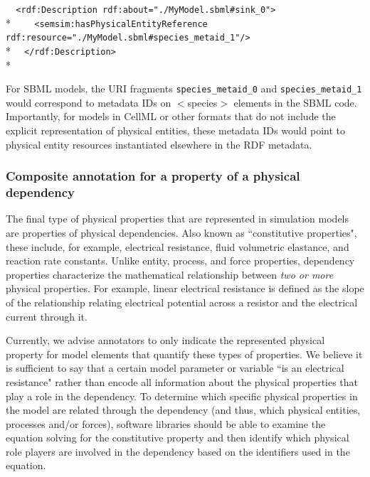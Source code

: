 \documentclass[pdftex,rgb,dvipsnames,svgnames,hyperref,table]{report}
\begin{document}
  \verb|  <rdf:Description rdf:about="./MyModel.sbml#sink_0">|\\*
  \verb|    <semsim:hasPhysicalEntityReference rdf:resource="./MyModel.sbml#species_metaid_1"/>|\\*
  \verb|  </rdf:Description>|\\*
  
  
  
For SBML models, the URI fragments \texttt{species\_metaid\_0} and \texttt{species\_metaid\_1} would correspond to metadata IDs on $<$species$>$ elements in the SBML code. Importantly, for models in CellML or other formats that do not include the explicit representation of physical entities, these metadata IDs would point to physical entity resources instantiated elsewhere in the RDF metadata.

\subsubsection{Composite annotation for a property of a physical dependency}

The final type of physical properties that are represented in simulation models are properties of physical dependencies. Also known as ``constitutive properties", these include, for example, electrical resistance, fluid volumetric elastance, and reaction rate constants. Unlike entity, process, and force properties, dependency properties characterize the mathematical relationship between \textit{two or more} physical properties. For example, linear electrical resistance is defined as the slope of the relationship relating electrical potential across a resistor and the electrical current through it.

Currently, we advise annotators to only indicate the represented physical property for model elements that quantify these types of properties. We believe it is sufficient to say that a certain model parameter or variable ``is an electrical resistance" rather than encode all information about the physical properties that play a role in the dependency. To determine which specific physical properties in the model are related through the dependency (and thus, which physical entities, processes and/or forces), software libraries should be able to examine the equation solving for the constitutive property and then identify which physical role players are involved in the dependency based on the identifiers used in the equation.
\end{document}
